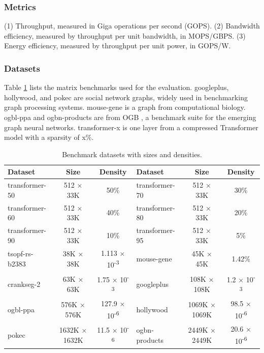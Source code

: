 \documentclass[manuscript,screen,review]{acmart}
\begin{document}
\subsubsection{Metrics}
(1) Throughput, measured in Giga operations per second (GOPS). (2) Bandwidth efficiency, measured by throughput per unit bandwidth, in MOPS/GBPS. (3) Energy efficiency, measured by throughput per unit power, in GOPS/W.

\subsubsection{Datasets}
Table \ref{datasets} lists the matrix benchmarks used for the evaluation.
googleplus, hollywood, and pokec are social network graphs, widely used in benchmarking graph processing systems. mouse-gene is a graph from computational biology. ogbl-ppa and ogbn-products are from OGB \cite{ogb}, a benchmark suite for the
emerging graph neural networks. transformer-x is one layer from
a compressed Transformer \cite{transformer} model with a sparsity of x\%.


\begin{table}[h!]
	\centering
     \begin{tabular}{|l|c|c||l|c|c|}
		\hline
		\textbf{Dataset} & \textbf{Size} & \textbf{Density} & \textbf{Dataset} & \textbf{Size} & \textbf{Density} \\
		\hline
		transformer-50 & 512 × 33K & 50\% & transformer-70 & 512 × 33K & 30\% \\
		transformer-60 & 512 × 33K & 40\% & transformer-80 & 512 × 33K & 20\% \\
		transformer-90 & 512 × 33K & 10\% & transformer-95 & 512 × 33K & 5\% \\
		tsopf-rs-b2383 & 38K × 38K & 1.113 × 10\textsuperscript{-3} & mouse-gene & 45K × 45K & 1.42\% \\
		crankseg-2 & 63K × 63K & 1.75 × 10\textsuperscript{-3} & googleplus & 108K × 108K & 1.2 × 10\textsuperscript{-3} \\
		ogbl-ppa & 576K × 576K & 127.9 × 10\textsuperscript{-6} & hollywood & 1069K × 1069K & 98.5 × 10\textsuperscript{-6} \\
		pokec & 1632K × 1632K & 11.5 × 10\textsuperscript{-6} & ogbn-products & 2449K × 2449K & 20.6 × 10\textsuperscript{-6} \\
		\hline
	\end{tabular}
	\caption{Benchmark datasets with sizes and densities.}
	\label{datasets}
\end{table}
\end{document}
